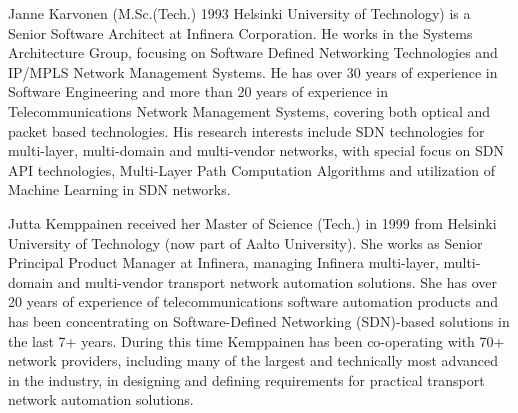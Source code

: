 \documentclass[10pt, conference]{IEEEtran}
\begin{document}
\begin{IEEEbiography}%
{Janne Karvonen} (M.Sc.(Tech.) 1993 Helsinki University of Technology) is a Senior Software Architect at Infinera Corporation. He works in the Systems Architecture Group, focusing on Software Defined Networking Technologies and IP/MPLS Network Management Systems. He has over 30 years of experience in Software Engineering and more than 20 years of experience in Telecommunications Network Management Systems, covering both optical and packet based technologies. His research interests include SDN technologies for multi-layer, multi-domain and multi-vendor networks, with special focus on SDN API technologies, Multi-Layer Path Computation Algorithms and utilization of Machine Learning in SDN networks.\end{IEEEbiography}

\begin{IEEEbiography}%
{Jutta Kemppainen} received her Master of Science (Tech.) in 1999 from Helsinki University of Technology (now part of Aalto University). She works as Senior Principal Product Manager at Infinera, managing Infinera multi-layer, multi-domain and multi-vendor transport network automation solutions. She has over 20 years of experience of telecommunications software automation products and has been concentrating on Software-Defined Networking (SDN)-based solutions in the last 7+ years. During this time Kemppainen has been co-operating with 70+ network providers, including many of the largest and technically most advanced in the industry, in designing and defining requirements for practical transport network automation solutions.\end{IEEEbiography}
\end{document}
